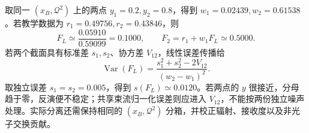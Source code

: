 \begin{exbox}[纵向响应的数值提取与误差]
取同一 $(x_B,\mathcal Q^2)$ 上的两点 $y_1=0.2,y_2=0.8$，得到
$w_1=0.02439,w_2=0.61538$。若教学数据为 $r_1=0.49756,r_2=0.43846$，则
\begin{equation*}
 F_L\simeq\frac{0.05910}{0.59099}=0.1000,\qquad
 F_2=r_1+w_1F_L\simeq0.5000.
\end{equation*}
若两个截面具有标准差 $s_1,s_2$、协方差 $V_{12}$，线性误差传播给
\begin{equation*}
 \operatorname{Var}(F_L)
 =\frac{s_1^2+s_2^2-2V_{12}}{(w_2-w_1)^2}.
\end{equation*}
取独立误差 $s_1=s_2=0.005$，得到 $s(F_L)\simeq0.0120$。若两点的 $y$ 很接近，分母趋于零，反演便不稳定；共享束流归一化误差则应进入 $V_{12}$，不能按两份独立噪声处理。实际分离还需保持相同的 $(x_B,\mathcal Q^2)$ 分箱，并校正辐射、接收度以及非光子交换贡献。
\end{exbox}

